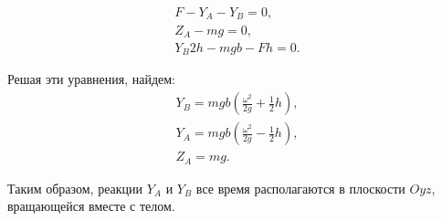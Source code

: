 \documentclass[14pt,a4paper,oneside]{extarticle}	%
\begin{document}
\begin{eqnarray}\label{freeaxis-eq1}
F -  Y_{A} -  Y_{B} = 0, \\
Z_{A} - mg = 0,\\
Y_{B}2h - mgb-Fh=0.
\end{eqnarray}

Решая эти уравнения, найдем:
\begin{eqnarray}\label{freeaxis-eq2}
Y_{B} = mgb\left(\frac{\omega^{2}}{2g} + \frac{1}{2}h\right), \\
Y_{A} = mgb\left(\frac{\omega^{2}}{2g} - \frac{1}{2}h\right),\\
Z_{A} = mg.
\end{eqnarray}

Таким образом, реакции $ Y_{A} $ и $ Y_{B} $ все время располагаются в плоскости $ Oyz $, вращающейся вместе с телом.
\end{document}
